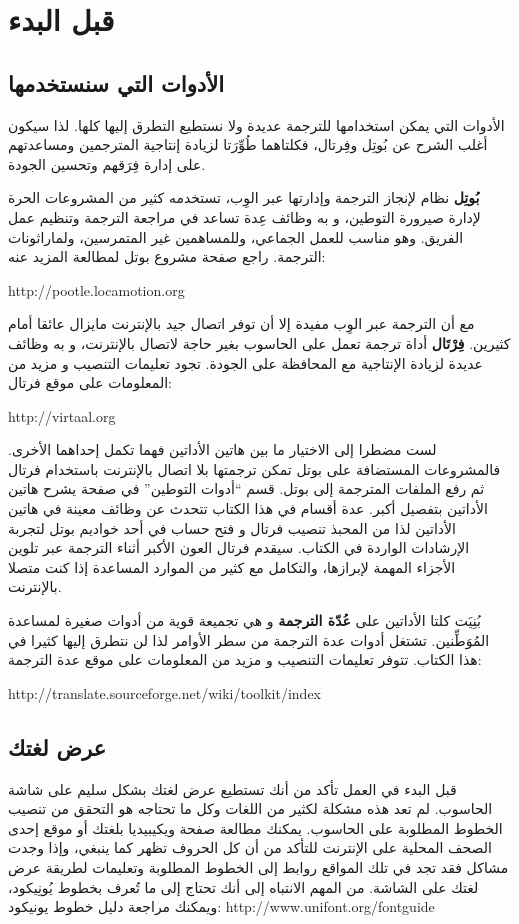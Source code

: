 \chapter{قبل البدء}
\section{الأدوات التي سنستخدمها}
الأدوات التي يمكن استخدامها
للترجمة عديدة ولا نستطيع التطرق إليها كلها. لذا سيكون أغلب الشرح عن
بُوتِل وفِرتال، فكلتاهما طُوِّرَتا لزيادة إنتاجية المترجمين ومساعدتهم
على إدارة فِرَقهم وتحسين الجودة.

{\bf بُوتِل} نظام لإنجاز الترجمة وإدارتها عبر الوِب، تستخدمه كثير من
المشروعات الحرة لإدارة صيرورة التوطين، و به وظائف عِدة تساعد في مراجعة
الترجمة وتنظيم عمل الفريق. وهو مناسب للعمل الجماعي، وللمساهمين غير
المتمرسين، ولماراثونات الترجمة. راجع صفحة مشروع بوتل لمطالعة المزيد
عنه:

http://pootle.locamotion.org

مع أن الترجمة عبر الوِب مفيدة إلا أن توفر اتصال جيد بالإنترنت مايزال
عائقا أمام كثيرين. {\bf فِرْتَال} أداة ترجمة تعمل على الحاسوب بغير حاجة
لاتصال بالإنترنت، و به وظائف عديدة لزيادة الإنتاجية مع المحافظة على
الجودة. تجود تعليمات التنصيب و مزيد من المعلومات على موقع فرتال:

http://virtaal.org

لست مضطرا إلى الاختيار ما بين هاتين الأداتين فهما تكمل إحداهما الأخرى.
فالمشروعات المستضافة على بوتل تمكن ترجمتها بلا اتصال بالإنترنت باستخدام
فرتال ثم رفع الملفات المترجمة إلى بوتل. قسم “أدوات التوطين” في صفحة
 يشرح هاتين الأداتين بتفصيل أكبر. عدة أقسام
في هذا الكتاب تتحدث عن وظائف معينة في هاتين الأداتين لذا من المحبذ
تنصيب فرتال و فتح حساب في أحد خواديم بوتل لتجربة الإرشادات الواردة في
الكتاب. سيقدم فرتال العون الأكبر أثناء الترجمة عبر تلوين الأجزاء المهمة
لإبرازها، والتكامل مع كثير من الموارد المساعدة إذا كنت متصلا بالإنترنت.

بُنِيَت كلتا الأداتين على {\bf عُدّة الترجمة} و هي تجميعة قوية من أدوات
صغيرة لمساعدة المُوَطِّنين. تشتغل أدوات عدة الترجمة من سطر الأوامر لذا
لن نتطرق إليها كثيرا في هذا الكتاب. تتوفر تعليمات التنصيب و مزيد من
المعلومات على موقع عدة الترجمة:

http://translate.sourceforge.net/wiki/toolkit/index

\section{عرض لغتك}
قبل البدء في العمل تأكد من أنك تستطيع عرض لغتك بشكل سليم على شاشة
الحاسوب. لم تعد هذه مشكلة لكثير من اللغات وكل ما تحتاجه هو التحقق من
تنصيب الخطوط المطلوبة على الحاسوب. يمكنك مطالعة صفحة ويكيبيديا بلغتك أو
موقع إحدى الصحف المحلية على الإنترنت للتأكد من أن كل الحروف تظهر كما
ينبغي، وإذا وجدت مشاكل فقد تجد في تلك المواقع روابط إلى الخطوط المطلوبة
وتعليمات لطريقة عرض لغتك على الشاشة. من المهم الانتباه إلى أنك تحتاج
إلى ما تُعرف بخطوط يُونِيكود، ويمكنك مراجعة دليل خطوط يونيكود:
http://www.unifont.org/fontguide

